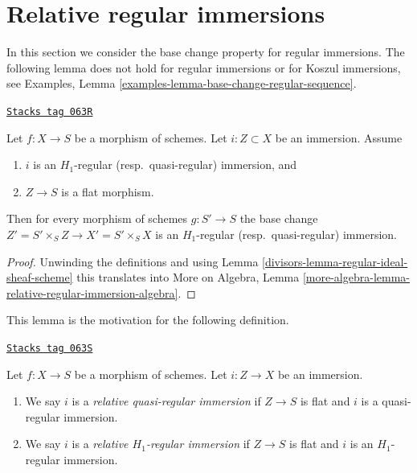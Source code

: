 \section{Relative regular immersions}
\label{divisors-section-relative-regular-immersion}
In this section we consider the base change property for regular immersions.
The following lemma does not hold for regular immersions
or for Koszul immersions, see
Examples, Lemma \ref{examples-lemma-base-change-regular-sequence}.

\begin{lemma}
\label{divisors-lemma-relative-regular-immersion}
\href{https://stacks.math.columbia.edu/tag/063R}{\texttt{Stacks tag 063R}}

Let $f : X \to S$ be a morphism of schemes.
Let $i : Z \subset X$ be an immersion.
Assume
\begin{enumerate}
\item $i$ is an $H_1$-regular (resp.\ quasi-regular) immersion, and
\item $Z \to S$ is a flat morphism.
\end{enumerate}
Then for every morphism of schemes $g : S' \to S$ the base change
$Z' = S' \times_S Z \to X' = S' \times_S X$
is an $H_1$-regular (resp.\ quasi-regular) immersion.
\end{lemma}

\begin{proof}

Unwinding the definitions and using
Lemma \ref{divisors-lemma-regular-ideal-sheaf-scheme}
this translates into More on Algebra, Lemma
\ref{more-algebra-lemma-relative-regular-immersion-algebra}.
\end{proof}

This lemma is the motivation for the following definition.

\begin{definition}
\label{divisors-definition-relative-H1-regular-immersion}
\href{https://stacks.math.columbia.edu/tag/063S}{\texttt{Stacks tag 063S}}

Let $f : X \to S$ be a morphism of schemes.
Let $i : Z \to X$ be an immersion.
\begin{enumerate}
\item We say $i$ is a {\it relative quasi-regular immersion}
if $Z \to S$ is flat and $i$ is a quasi-regular immersion.
\item We say $i$ is a {\it relative $H_1$-regular immersion}
if $Z \to S$ is flat and $i$ is an $H_1$-regular immersion.
\end{enumerate}
\end{definition}

